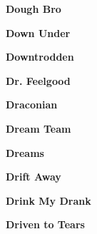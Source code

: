 \vspace{10pt} 
\begin{center}\textbf{Dough Bro}\end{center}
\newline
\vspace{10pt} 
\begin{center}\textbf{Down Under}\end{center}
\newline
\vspace{10pt} 
\begin{center}\textbf{Downtrodden}\end{center}
\newline
\vspace{10pt} 
\begin{center}\textbf{Dr. Feelgood}\end{center}
\newline
\vspace{10pt} 
\begin{center}\textbf{Draconian}\end{center}
\newline
\vspace{10pt} 
\begin{center}\textbf{Dream Team}\end{center}
\newline
\vspace{10pt} 
\begin{center}\textbf{Dreams}\end{center}
\newline
\vspace{10pt} 
\begin{center}\textbf{Drift Away}\end{center}
\newline
\vspace{10pt} 
\begin{center}\textbf{Drink My Drank}\end{center}
\newline
\vspace{10pt} 
\begin{center}\textbf{Driven to Tears}\end{center}
\newline
